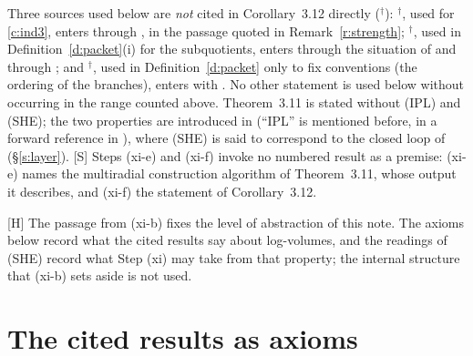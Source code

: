\documentclass[11pt]{article}
\theoremstyle{plain}
\theoremstyle{definition}
\theoremstyle{remark}
\newcommand{\Smark}{\textup{[S]}}
\newcommand{\Hmark}{\textup{[H]}}
\begin{document}
Three sources used below are \emph{not} cited in Corollary~3.12 directly ($^\dagger$):
\cite[Prop.~3.5(ii)]{IUT3}$^\dagger$, used for \ref{c:ind3}, enters through
\cite[Thm.~3.11(ii)]{IUT3}, in the passage quoted in Remark~\ref{r:strength};
\cite[Prop.~3.2(ii)]{IUT3}$^\dagger$, used in Definition~\ref{d:packet}(i) for the
subquotients, enters through the situation of \cite[Prop.~3.9(i)]{IUT3} and through
\cite[Thm.~3.11(i)(a)]{IUT3}; and \cite[Rem.~3.9.1]{IUT3}$^\dagger$, used in
Definition~\ref{d:packet} only to fix conventions (the ordering of the branches), enters
with \cite[Prop.~3.9]{IUT3}. No other statement is used below without occurring in the
range counted above.
Theorem~3.11 is stated without (IPL) and (SHE); the two properties are introduced in
\cite[Rem.~3.11.1(iii)]{IUT3} (``IPL'' is mentioned before, in a forward reference in
\cite[Rem.~3.9.5(ix)]{IUT3}), where (SHE) is said to correspond to the closed loop of
\cite[Rem.~3.9.5(viii)(ix)]{IUT3} (\S\ref{s:layer}). \Smark{} Steps (xi-e) and (xi-f)
invoke no numbered result as a premise: (xi-e) names the multiradial construction algorithm
of Theorem~3.11, whose output it describes, and (xi-f) the statement of Corollary~3.12.

\Hmark{} The passage from (xi-b) fixes the level of abstraction of this note. The axioms
below record what the cited results say about log-volumes, and the readings of (SHE)
record what Step (xi) may take from that property; the internal structure that (xi-b)
sets aside is not used.

\section{The cited results as axioms}\label{s:axioms}
\end{document}
